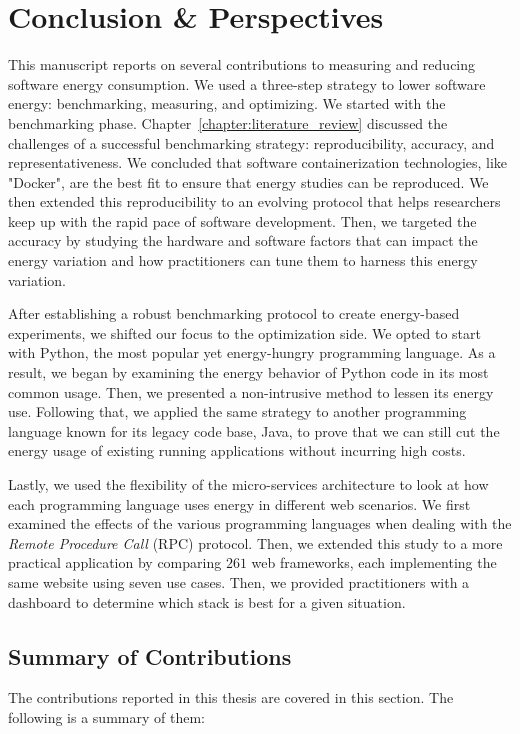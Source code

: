 \clearpage
\chapter{Conclusion \& Perspectives}
\label{chapter:conclusion}

This manuscript reports on several contributions to measuring and reducing software energy consumption.
We used a three-step strategy to lower software energy: benchmarking, measuring, and optimizing.
We started with the benchmarking phase.
Chapter~\ref{chapter:literature_review} discussed the challenges of a successful benchmarking strategy: reproducibility, accuracy, and representativeness.
We concluded that software containerization technologies, like "Docker", are the best fit to ensure that energy studies can be reproduced.
We then extended this reproducibility to an evolving protocol that helps researchers keep up with the rapid pace of software development.
Then, we targeted the accuracy by studying the hardware and software factors that can impact the energy variation and how practitioners can tune them to harness this energy variation.

After establishing a robust benchmarking protocol to create energy-based experiments, we shifted our focus to the optimization side.
We opted to start with Python, the most popular yet energy-hungry programming language.
As a result, we began by examining the energy behavior of Python code in its most common usage.
Then, we presented a non-intrusive method to lessen its energy use.
Following that, we applied the same strategy to another programming language known for its legacy code base, Java, to prove that we can still cut the energy usage of existing running applications without incurring high costs.

Lastly, we used the flexibility of the micro-services architecture to look at how each programming language uses energy in different web scenarios.
We first examined the effects of the various programming languages when dealing with the \emph{Remote Procedure Call} (RPC) protocol.
Then, we extended this study to a more practical application by comparing $261$ web frameworks, each implementing the same website using seven use cases.
Then, we provided practitioners with a dashboard to determine which stack is best for a given situation.


\section{Summary of Contributions}
\label{section:SummaryofContributions}
The contributions reported in this thesis are covered in this section.
The following is a summary of them:

